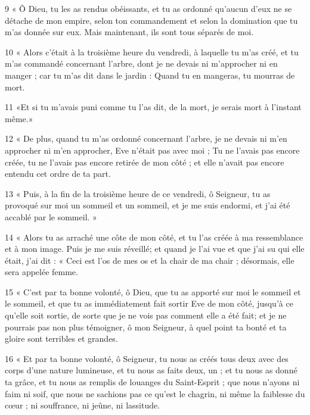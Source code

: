 \par 9 « Ô Dieu, tu les as rendus obéissants, et tu as ordonné qu'aucun d'eux ne se détache de mon empire, selon ton commandement et selon la domination que tu m'as donnée sur eux. Mais maintenant, ils sont tous séparés de moi.

\par 10 « Alors c'était à la troisième heure du vendredi, à laquelle tu m'as créé, et tu m'as commandé concernant l'arbre, dont je ne devais ni m'approcher ni en manger ; car tu m'as dit dans le jardin : Quand tu en mangeras, tu mourras de mort.

\par 11 «Et si tu m'avais puni comme tu l'as dit, de la mort, je serais mort à l'instant même.»

\par 12 « De plus, quand tu m'as ordonné concernant l'arbre, je ne devais ni m'en approcher ni m'en approcher, Eve n'était pas avec moi ; Tu ne l'avais pas encore créée, tu ne l'avais pas encore retirée de mon côté ; et elle n’avait pas encore entendu cet ordre de ta part.

\par 13 « Puis, à la fin de la troisième heure de ce vendredi, ô Seigneur, tu as provoqué sur moi un sommeil et un sommeil, et je me suis endormi, et j'ai été accablé par le sommeil. »

\par 14 « Alors tu as arraché une côte de mon côté, et tu l'as créée à ma ressemblance et à mon image. Puis je me suis réveillé; et quand je l'ai vue et que j'ai su qui elle était, j'ai dit : « Ceci est l'os de mes os et la chair de ma chair ; désormais, elle sera appelée femme.

\par 15 « C'est par ta bonne volonté, ô Dieu, que tu as apporté sur moi le sommeil et le sommeil, et que tu as immédiatement fait sortir Eve de mon côté, jusqu'à ce qu'elle soit sortie, de sorte que je ne vois pas comment elle a été fait; et je ne pourrais pas non plus témoigner, ô mon Seigneur, à quel point ta bonté et ta gloire sont terribles et grandes.

\par 16 « Et par ta bonne volonté, ô Seigneur, tu nous as créés tous deux avec des corps d'une nature lumineuse, et tu nous as faits deux, un ; et tu nous as donné ta grâce, et tu nous as remplis de louanges du Saint-Esprit ; que nous n'ayons ni faim ni soif, que nous ne sachions pas ce qu'est le chagrin, ni même la faiblesse du cœur ; ni souffrance, ni jeûne, ni lassitude.

